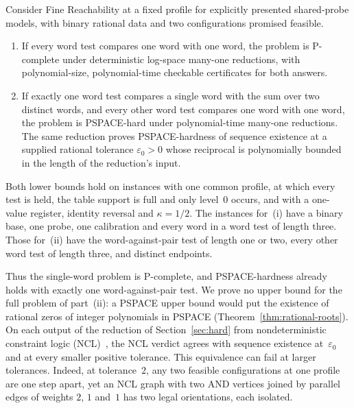 \begin{theorem}\label{thm:boundary}
Consider Fine Reachability at a fixed profile for explicitly presented
shared-probe models, with binary rational data and two configurations
promised feasible.
\begin{enumerate}
\item[(i)] If every word test compares one word with one word, the problem
is P-complete under deterministic log-space many-one reductions, with
polynomial-size, polynomial-time checkable certificates for both answers.
\item[(ii)] If exactly one word test compares a single word with the sum
over two distinct words, and every other word test compares one word with
one word, the problem is PSPACE-hard under polynomial-time many-one
reductions. The same reduction proves PSPACE-hardness of sequence existence
at a supplied rational tolerance $\varepsilon_0>0$ whose reciprocal is
polynomially bounded in the length of the reduction's input.
\end{enumerate}
Both lower bounds hold on instances with one common profile, at which every
test is held, the table support is full and only level~$0$ occurs, and with
a one-value register, identity reversal and $\kappa=1/2$. The instances for~(i) have a binary base, one probe,
one calibration and every word in a word test of length three. Those
for~(ii) have the word-against-pair test of length one or two, every other
word test of length three, and distinct endpoints.
\end{theorem}

Thus the single-word problem is P-complete, and PSPACE-hardness already
holds with exactly one word-against-pair test. We prove no upper bound for the full problem of part~(ii):
a PSPACE upper bound would put the existence of rational zeros of integer
polynomials in PSPACE (Theorem~\ref{thm:rational-roots}). On each output
of the reduction of Section~\ref{sec:hard} from nondeterministic constraint
logic (NCL)~\cite{hearndemaine}, the NCL verdict agrees with sequence
existence at~$\varepsilon_0$ and at every smaller positive tolerance. This
equivalence can fail at larger tolerances. Indeed, at tolerance~$2$, any
two feasible configurations at one profile are one step apart, yet an NCL
graph with two AND vertices joined by parallel edges of weights $2$, $1$
and~$1$ has two legal orientations, each isolated.

